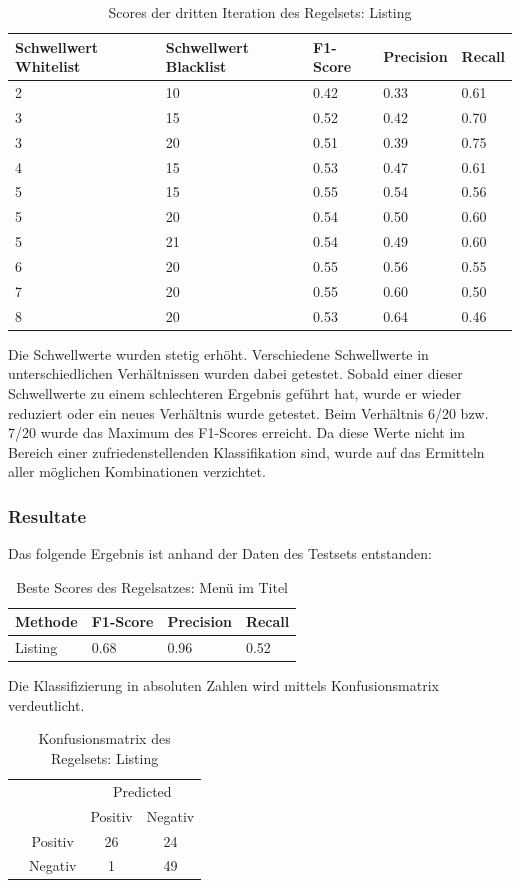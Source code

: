 \begin{table}[H]
	\caption{Scores der dritten Iteration des Regelsets: Listing}
	\centering
	\begin{tabular}{|l|l|l|l|l|}
		\hline
		Schwellwert Whitelist & Schwellwert Blacklist & F1-Score & Precision & Recall\\
		\hline
		2 & 10 & 0.42 & 0.33 & 0.61 \\
		3 & 15 & 0.52 & 0.42 & 0.70 \\
		3 & 20 & 0.51 & 0.39 & 0.75 \\
		4 & 15 & 0.53 & 0.47 & 0.61 \\
		5 & 15 & 0.55 & 0.54 & 0.56 \\
		5 & 20 & 0.54 & 0.50 & 0.60 \\
		5 & 21 & 0.54 & 0.49 & 0.60 \\
		6 & 20 & 0.55 & 0.56 & 0.55 \\
		7 & 20 & 0.55 & 0.60 & 0.50 \\
		8 & 20 & 0.53 & 0.64 & 0.46 \\
		\hline
	\end{tabular}
\end{table}
Die Schwellwerte wurden stetig erhöht.
Verschiedene Schwellwerte in unterschiedlichen Verhältnissen wurden dabei getestet.
Sobald einer dieser Schwellwerte zu einem schlechteren Ergebnis geführt hat, wurde er wieder reduziert oder ein neues Verhältnis wurde getestet.
Beim Verhältnis 6/20 bzw. 7/20 wurde das Maximum des F1-Scores erreicht.
Da diese Werte nicht im Bereich einer zufriedenstellenden Klassifikation sind, wurde auf das Ermitteln aller möglichen Kombinationen verzichtet.
\subsubsection{Resultate}
Das folgende Ergebnis ist anhand der Daten des Testsets entstanden:
\begin{table}[H]
	\caption{Beste Scores des Regelsatzes: Menü im Titel}
	\centering
	\begin{tabular}{|l|l|l|l|}
		\hline
		Methode & F1-Score & Precision & Recall\\
		\hline
		Listing & 0.68 & 0.96 & 0.52\\
		\hline
	\end{tabular}
\end{table}
Die Klassifizierung in absoluten Zahlen wird mittels Konfusionsmatrix verdeutlicht.
\begin{table}[H]
	\caption{Konfusionsmatrix des Regelsets: Listing}
	\centering
	\begin{tabular}{@{}cc|cc@{}}
		\multicolumn{1}{c}{} &\multicolumn{1}{c}{} &\multicolumn{2}{c}{Predicted} \\ 
		\multicolumn{1}{c}{} & 
		\multicolumn{1}{c|}{} & 
		\multicolumn{1}{c}{Positiv} & 
		\multicolumn{1}{c}{Negativ} \\ 
		\cline{2-4}
		\multirow[c]{2}{*}{\rotatebox[origin=tr]{90}{Actual}}
		& Positiv  & 26   & 24   \\[1.5ex]
		& Negativ  & 1   & 49 \\ 
		\cline{2-4}
	\end{tabular}
\end{table}
